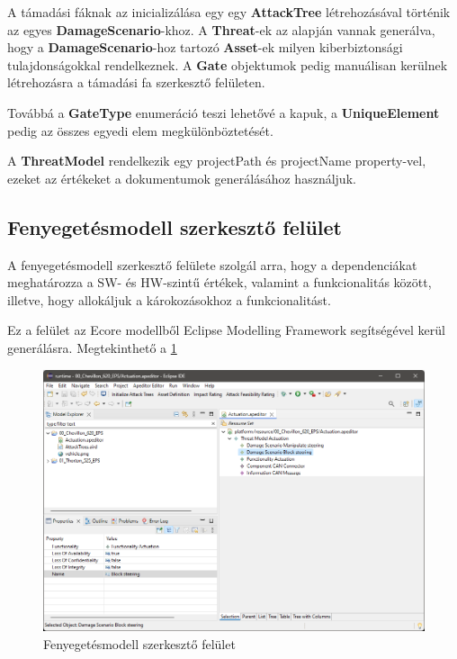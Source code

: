 A támadási fáknak az inicializálása egy egy \textbf{AttackTree} létrehozásával történik az egyes \textbf{DamageScenario}-khoz. A \textbf{Threat}-ek az alapján vannak generálva, hogy a \textbf{DamageScenario}-hoz tartozó \textbf{Asset}-ek milyen kiberbiztonsági tulajdonságokkal rendelkeznek. A \textbf{Gate} objektumok pedig manuálisan kerülnek létrehozásra a támadási fa szerkesztő felületen.

Továbbá a \textbf{GateType} enumeráció teszi lehetővé a kapuk, a \textbf{UniqueElement} pedig az összes egyedi elem megkülönböztetését.

A \textbf{ThreatModel} rendelkezik egy projectPath és projectName property-vel, ezeket az értékeket a dokumentumok generálásához használjuk.


\subsection{Fenyegetésmodell szerkesztő felület}

A fenyegetésmodell szerkesztő felülete szolgál arra, hogy a dependenciákat meghatározza a SW- és HW-szintű értékek, valamint a funkcionalitás között, illetve, hogy allokáljuk a károkozásokhoz a funkcionalitást.

Ez a felület az Ecore modellből Eclipse Modelling Framework segítségével kerül generálásra. Megtekinthető a \ref{fig:05_tmeditor}

\begin{figure}[!ht]
	\centering
	\includegraphics[width=130mm, keepaspectratio]{figures/05_tmeditor_ds.png}
	\caption{Fenyegetésmodell szerkesztő felület}
	\label{fig:05_tmeditor}
\end{figure}

